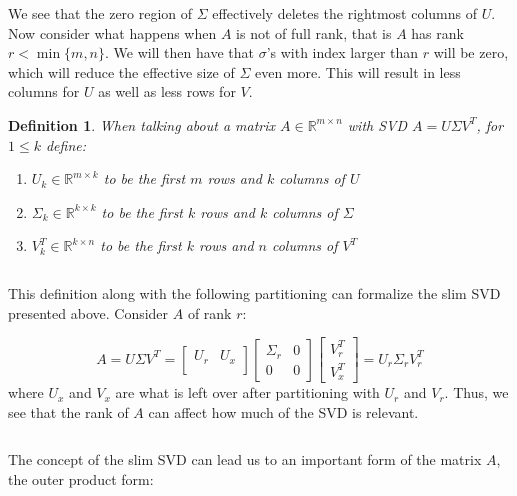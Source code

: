 \documentclass[a4paper]{article}
\newtheorem{definition}[theorem]{Definition}
\begin{document}
We see that the zero region of $\Sigma$ effectively deletes the rightmost columns of $U$.  Now consider what happens when $A$ is not of full rank, that is $A$ has rank $r<\min\{m,n\}$.  We will then have that $\sigma$'s with index larger than $r$ will be zero, which will reduce the effective size of $\Sigma$ even more.  This will result in less columns for $U$ as well as less rows for $V$.

\begin{definition}
When talking about a matrix $A\in \mathbb{R}^{m\times n}$ with SVD $A=U\Sigma V^T$, for $1\leq k$ define:
\begin{enumerate}
\item $U_k \in \mathbb{R}^{m\times k}$ to be the first $m$ rows and $k$ columns of $U$
\item $\Sigma_k \in \mathbb{R}^{k\times k}$ to be the first $k$ rows and $k$ columns of $\Sigma$
\item $V^T_k \in \mathbb{R}^{k\times n}$ to be the first $k$ rows and $n$ columns of $V^T$
\end{enumerate}
\end{definition}

$$
$$

This definition along with the following partitioning can formalize the slim SVD presented above. Consider $A$ of rank $r$:



$$
A = U\Sigma V^T =
\begin{bmatrix}
U_r & U_x\\
\end{bmatrix}
\begin{bmatrix}
\Sigma_r & 0\\
0 & 0
\end{bmatrix}
\begin{bmatrix}
V_r^T \\ V_x^T
\end{bmatrix}
=
U_r \Sigma_r V_r^T
$$
where $U_x$ and $V_x$ are what is left over after partitioning with $U_r$ and $V_r$.  Thus, we see that the rank of $A$ can affect how much of the SVD is relevant.

$$
$$

The concept of the slim SVD can lead us to an important form of the matrix $A$, the outer product form:

\end{document}
